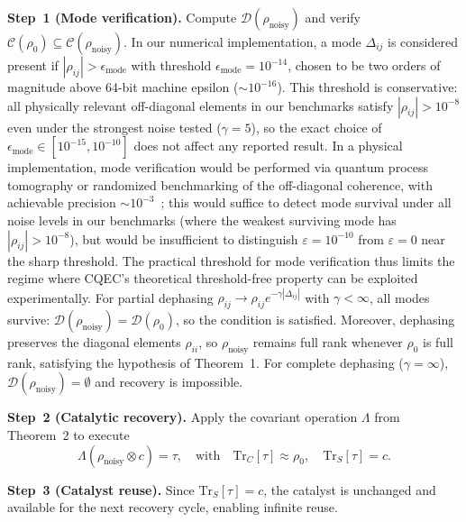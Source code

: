 \documentclass[prx,twocolumn,superscriptaddress,longbibliography,floatfix]{revtex4-2}
\begin{document}
\textbf{Step~1 (Mode verification).}
Compute $\mathcal{D}(\rho_\mathrm{noisy})$ and verify $\mathcal{C}(\rho_0) \subseteq \mathcal{C}(\rho_\mathrm{noisy})$.
In our numerical implementation, a mode $\Delta_{ij}$ is considered present if $|\rho_{ij}| > \epsilon_\mathrm{mode}$ with threshold $\epsilon_\mathrm{mode} = 10^{-14}$, chosen to be two orders of magnitude above 64-bit machine epsilon ($\sim 10^{-16}$).
This threshold is conservative: all physically relevant off-diagonal elements in our benchmarks satisfy $|\rho_{ij}| > 10^{-8}$ even under the strongest noise tested ($\gamma = 5$), so the exact choice of $\epsilon_\mathrm{mode} \in [10^{-15}, 10^{-10}]$ does not affect any reported result.
In a physical implementation, mode verification would be performed via quantum process tomography or randomized benchmarking of the off-diagonal coherence, with achievable precision $\sim 10^{-3}$~\cite{NielsenChuang2010}; this would suffice to detect mode survival under all noise levels in our benchmarks (where the weakest surviving mode has $|\rho_{ij}| > 10^{-8}$), but would be insufficient to distinguish $\varepsilon = 10^{-10}$ from $\varepsilon = 0$ near the sharp threshold.
The practical threshold for mode verification thus limits the regime where CQEC's theoretical threshold-free property can be exploited experimentally.
For partial dephasing $\rho_{ij} \to \rho_{ij} e^{-\gamma|\Delta_{ij}|}$ with $\gamma < \infty$, all modes survive: $\mathcal{D}(\rho_\mathrm{noisy}) = \mathcal{D}(\rho_0)$, so the condition is satisfied.
Moreover, dephasing preserves the diagonal elements $\rho_{ii}$, so $\rho_\mathrm{noisy}$ remains full rank whenever $\rho_0$ is full rank, satisfying the hypothesis of Theorem~1.
For complete dephasing ($\gamma = \infty$), $\mathcal{D}(\rho_\mathrm{noisy}) = \emptyset$ and recovery is impossible.

\textbf{Step~2 (Catalytic recovery).}
Apply the covariant operation $\Lambda$ from Theorem~2 to execute
\begin{equation}
\Lambda(\rho_\mathrm{noisy} \otimes c) = \tau, \quad \text{with} \quad \mathrm{Tr}_C[\tau] \approx \rho_0, \quad \mathrm{Tr}_S[\tau] = c.
\label{eq:recovery}
\end{equation}

\textbf{Step~3 (Catalyst reuse).}
Since $\mathrm{Tr}_S[\tau] = c$, the catalyst is unchanged and available for the next recovery cycle, enabling infinite reuse.
\end{document}

